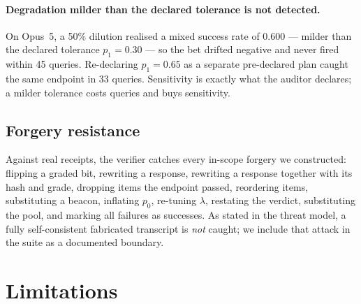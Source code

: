 \documentclass[11pt]{article}
\theoremstyle{definition}
\begin{document}
\paragraph{Degradation milder than the declared tolerance is not detected.} On
Opus~5, a 50\% dilution realised a mixed success rate of $0.600$ --- milder than
the declared tolerance $p_1 = 0.30$ --- so the bet drifted negative and never
fired within 45 queries. Re-declaring $p_1 = 0.65$ as a separate pre-declared
plan caught the same endpoint in 33 queries. Sensitivity is exactly what the
auditor declares; a milder tolerance costs queries and buys sensitivity.

\subsection{Forgery resistance}

Against real receipts, the verifier catches every in-scope forgery we
constructed: flipping a graded bit, rewriting a response, rewriting a response
together with its hash and grade, dropping items the endpoint passed, reordering
items, substituting a beacon, inflating $p_0$, re-tuning $\lambda$, restating the
verdict, substituting the pool, and marking all failures as successes. As stated
in the threat model, a fully self-consistent fabricated transcript is \emph{not}
caught; we include that attack in the suite as a documented boundary.

\section{Limitations}
\end{document}
